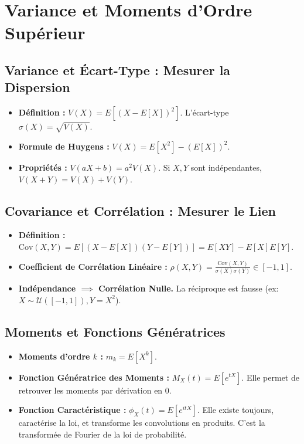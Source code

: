 \documentclass[12pt, a4paper, parskip=full]{report}
\theoremstyle{agregstyle}
\begin{document}
\section{Variance et Moments d'Ordre Supérieur}
\subsection{Variance et Écart-Type : Mesurer la Dispersion}
\begin{itemize}
    \item \textbf{Définition :} $V(X) = E[(X-E[X])^2]$. L'écart-type $\sigma(X) = \sqrt{V(X)}$.
    \item \textbf{Formule de Huygens :} $V(X) = E[X^2] - (E[X])^2$.
    \item \textbf{Propriétés :} $V(aX+b) = a^2 V(X)$. Si $X,Y$ sont indépendantes, $V(X+Y)=V(X)+V(Y)$.
\end{itemize}
\subsection{Covariance et Corrélation : Mesurer le Lien}
\begin{itemize}
    \item \textbf{Définition :} $\mathrm{Cov}(X,Y) = E[(X-E[X])(Y-E[Y])] = E[XY]-E[X]E[Y]$.
    \item \textbf{Coefficient de Corrélation Linéaire :} $\rho(X,Y) = \frac{\mathrm{Cov}(X,Y)}{\sigma(X)\sigma(Y)} \in [-1,1]$.
    \item \textbf{Indépendance $\implies$ Corrélation Nulle.} La réciproque est fausse (ex: $X \sim \mathcal{U}([-1,1]), Y=X^2$).
\end{itemize}
\subsection{Moments et Fonctions Génératrices}
\begin{itemize}
    \item \textbf{Moments d'ordre $k$ :} $m_k=E[X^k]$.
    \item \textbf{Fonction Génératrice des Moments :} $M_X(t) = E[e^{tX}]$. Elle permet de retrouver les moments par dérivation en 0.
    \item \textbf{Fonction Caractéristique :} $\phi_X(t) = E[e^{itX}]$. Elle existe toujours, caractérise la loi, et transforme les convolutions en produits. C'est la transformée de Fourier de la loi de probabilité.
\end{itemize}
\end{document}
